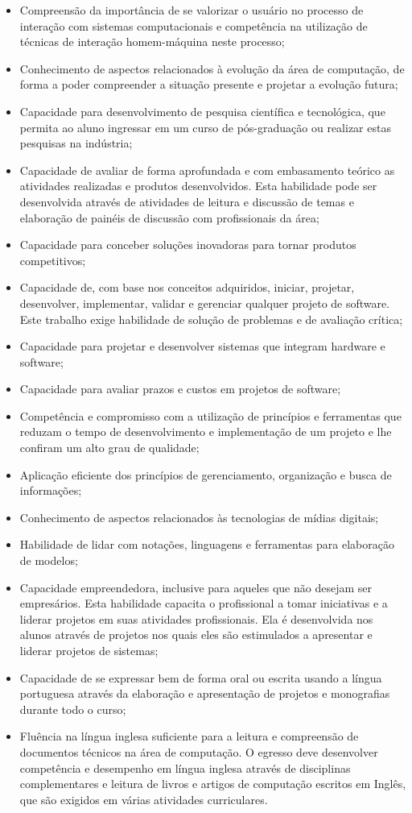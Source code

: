 \documentclass[
	12pt,				%
	openright,			%
  oneside,     %
	a4paper,			%
 hyphens,
	chapter=TITLE,		%
	english,			%
	french,				%
	spanish,			%
	brazil				%
	]{abntex2}
\begin{document}
\begin{itemize}
    \item Compreensão da importância de se valorizar o  usuário  no  processo  de  interação com sistemas computacionais e competência na utilização de técnicas de interação homem-máquina neste processo;
    \item Conhecimento de aspectos relacionados à evolução da área de computação, de forma a poder compreender a situação presente e projetar a evolução futura;
    \item Capacidade para desenvolvimento de pesquisa científica e tecnológica, que permita ao aluno ingressar em um curso de pós-graduação ou realizar estas pesquisas na indústria;
    \item Capacidade de avaliar de forma aprofundada e com embasamento teórico as atividades realizadas e produtos desenvolvidos. Esta habilidade pode ser desenvolvida através de atividades de leitura e discussão de temas e elaboração de painéis de discussão com profissionais da área;
    \item Capacidade para conceber soluções inovadoras para tornar produtos competitivos;
    \item Capacidade de, com base nos conceitos adquiridos, iniciar, projetar, desenvolver, implementar, validar e gerenciar qualquer projeto de software. Este trabalho exige habilidade de solução de problemas e de avaliação crítica;
    \item Capacidade para projetar e desenvolver sistemas que integram hardware e software;
    \item Capacidade para avaliar prazos e custos em projetos de software;
    \item Competência e compromisso com a utilização de princípios e ferramentas que reduzam o tempo de desenvolvimento e implementação de um projeto e lhe confiram um alto grau de qualidade;
    \item Aplicação eficiente dos princípios de gerenciamento, organização e busca de informações;
    \item Conhecimento de aspectos relacionados às tecnologias de mídias digitais;
    \item Habilidade de lidar com notações, linguagens e ferramentas para elaboração de modelos;
    \item Capacidade empreendedora, inclusive para aqueles que não desejam ser empresários. Esta habilidade capacita o profissional a tomar iniciativas e a liderar projetos em suas atividades profissionais. Ela é desenvolvida nos alunos através de projetos nos quais eles são estimulados a apresentar e liderar projetos de sistemas;
    \item Capacidade de se expressar bem de forma oral ou escrita usando a língua portuguesa através da elaboração e apresentação de projetos e monografias durante todo o curso;
    \item Fluência na língua inglesa suficiente para a leitura e compreensão de documentos técnicos na área de computação. O egresso deve desenvolver competência e desempenho em língua inglesa através de disciplinas complementares e leitura de livros e artigos de computação escritos em Inglês, que são exigidos em várias atividades curriculares. 
\end{itemize}
\end{document}
